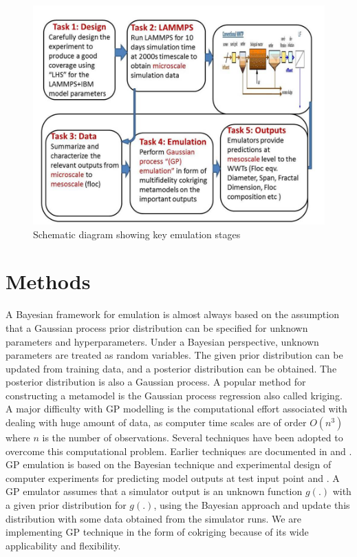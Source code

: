 \begin{figure}[!ht] 
\includegraphics[width=1\textwidth]{result2/box2}
\caption[]{Schematic diagram showing key emulation stages}\label{diag2c}
\end{figure}

\newpage
\section{Methods}
 A Bayesian framework for emulation is almost always based on the assumption that a Gaussian process prior distribution can be specified for unknown parameters and hyperparameters.  Under a Bayesian perspective, unknown parameters are treated as random variables. The given prior distribution can be updated from training data, and a posterior distribution can be obtained. The posterior distribution is also a Gaussian process.
A popular method for constructing a metamodel is the Gaussian process regression also called kriging. 
 A major difficulty with GP modelling is the computational effort associated with dealing with huge amount of data, as computer time scales are of order $O(n^3)$ where $n$ is the number of observations. Several techniques have been adopted to overcome this computational problem. Earlier techniques are documented in \citet{q10} and \cite{q47}. GP emulation is based on the Bayesian technique and experimental design of computer experiments for predicting model outputs at test input point \citet{q7} and \citet{70}. A GP emulator assumes that a simulator output is an unknown function $g(.)$ with a  given prior distribution for $g(.)$, using the Bayesian approach and update this distribution with some data obtained from the simulator runs. We are implementing GP technique in the form of cokriging because of its wide applicability and flexibility. %


